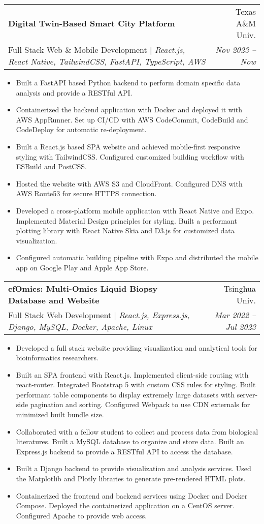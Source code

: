 \documentclass[letterpaper,11pt]{article}
\makeatletter
\newcommand{\mySecondaryItem}[1]{
  \item\raggedright\small{#1\vspace{-.5pt}}
}
\newcommand{\twoRowSubHeading}[4]{
  \item
  \begin{tabular*}{0.97\textwidth}{l@{\extracolsep{\fill}}r}
    \textbf{#1} & #2 \\
    \small #3 & \textit{\small #4} \\
  \end{tabular*}\vspace{-5pt}
}
\newcommand{\itemListStart}{\begin{itemize}[leftmargin=*]}
\newcommand{\itemListEnd}{\end{itemize}\vspace{-5pt}}
\makeatother
\begin{document}
\twoRowSubHeading
{Digital Twin-Based Smart City Platform
}
{Texas A\&M Univ.}
{Full Stack Web \& Mobile Development | \textit{React.js, React Native, TailwindCSS, FastAPI, TypeScript, AWS}}
{Nov 2023 -- Now}
\itemListStart
\mySecondaryItem{
  Built a FastAPI based Python backend to perform domain specific data analysis and provide a RESTful API.
}
\mySecondaryItem{
  Containerized the backend application with Docker and deployed it with AWS AppRunner. Set up CI/CD with AWS CodeCommit, CodeBuild and CodeDeploy for automatic re-deployment.
}
\mySecondaryItem{
  Built a React.js based SPA website and achieved mobile-first responsive styling with TailwindCSS. Configured customized building workflow with ESBuild and PostCSS.
}
\mySecondaryItem{
  Hosted the website with AWS S3 and CloudFront. Configured DNS with AWS Route53 for secure HTTPS connection.
}
\mySecondaryItem{
  Developed a cross-platform mobile application with React Native and Expo. Implemented Material Design principles for styling. Built a performant plotting library with React Native Skia and D3.js for customized data visualization.
}
\mySecondaryItem{
  Configured automatic building pipeline with Expo and distributed the mobile app on Google Play and Apple App Store.
}
\itemListEnd

\twoRowSubHeading
{cfOmics: Multi-Omics Liquid Biopsy Database and Website
  \small \href{https://github.com/choutianxius/cfomics}{\faGithub}
}
{Tsinghua Univ.}
{Full Stack Web Development | \textit{React.js, Express.js, Django, MySQL, Docker, Apache, Linux}}
{Mar 2022 -- Jul 2023}
\itemListStart
\mySecondaryItem{
  Developed a full stack website providing visualization and analytical tools for bioinformatics researchers.
}
\mySecondaryItem{
  Built an SPA frontend with React.js. Implemented client-side routing with react-router. Integrated Bootstrap 5 with custom CSS rules for styling. Built performant table components to display extremely large datasets with server-side pagination and sorting. Configured Webpack to use CDN externals for minimized built bundle size.
}
\mySecondaryItem{
  Collaborated with a fellow student to collect and process data from biological literatures. Built a MySQL database to organize and store data. Built an Express.js backend to provide a RESTful API to access the database.
}
\mySecondaryItem{
  Built a Django backend to provide visualization and analysis services. Used the Matplotlib and Plotly libraries to generate pre-rendered HTML plots.
}
\mySecondaryItem{
  Containerized the frontend and backend services using Docker and Docker Compose. Deployed the containerized application on a CentOS server. Configured Apache to provide web access.
}
\itemListEnd
\end{document}

